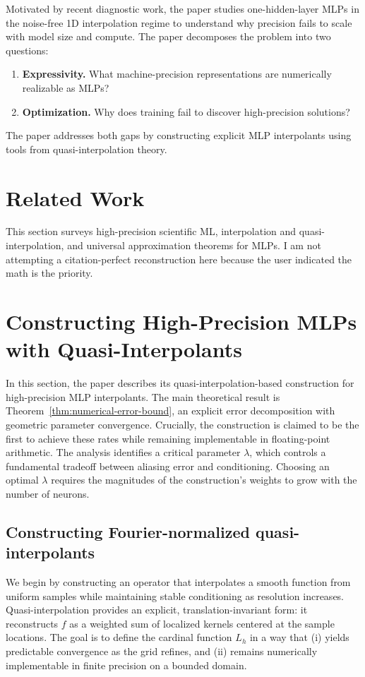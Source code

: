 \documentclass[11pt]{article}
\begin{document}
Motivated by recent diagnostic work, the paper studies one-hidden-layer MLPs in the noise-free 1D interpolation regime to understand why precision fails to scale with model size and compute. The paper decomposes the problem into two questions:
\begin{enumerate}[label=\arabic*.]
    \item \textbf{Expressivity.} What machine-precision representations are numerically realizable as MLPs?
    \item \textbf{Optimization.} Why does training fail to discover high-precision solutions?
\end{enumerate}

The paper addresses both gaps by constructing explicit MLP interpolants using tools from quasi-interpolation theory.

\section{Related Work}
This section surveys high-precision scientific ML, interpolation and quasi-interpolation, and universal approximation theorems for MLPs. I am not attempting a citation-perfect reconstruction here because the user indicated the math is the priority.

\section{Constructing High-Precision MLPs with Quasi-Interpolants}
In this section, the paper describes its quasi-interpolation-based construction for high-precision MLP interpolants. The main theoretical result is Theorem~\ref{thm:numerical-error-bound}, an explicit error decomposition with geometric parameter convergence. Crucially, the construction is claimed to be the first to achieve these rates while remaining implementable in floating-point arithmetic. The analysis identifies a critical parameter $\lambda$, which controls a fundamental tradeoff between aliasing error and conditioning. Choosing an optimal $\lambda$ requires the magnitudes of the construction's weights to grow with the number of neurons.

\subsection{Constructing Fourier-normalized quasi-interpolants}
We begin by constructing an operator that interpolates a smooth function from uniform samples while maintaining stable conditioning as resolution increases. Quasi-interpolation provides an explicit, translation-invariant form: it reconstructs $f$ as a weighted sum of localized kernels centered at the sample locations. The goal is to define the cardinal function $L_h$ in a way that (i) yields predictable convergence as the grid refines, and (ii) remains numerically implementable in finite precision on a bounded domain.
\end{document}
